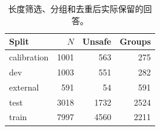 \begin{table}[t]
\centering\footnotesize
\caption{长度筛选、分组和去重后实际保留的回答。}\label{tab:dataset}
\begin{tabular}{lrrr}\toprule
Split & $N$ & Unsafe & Groups \\
\midrule
calibration & 1001 & 563 & 275 \\
dev & 1003 & 551 & 282 \\
external & 591 & 54 & 591 \\
test & 3018 & 1732 & 2524 \\
train & 7997 & 4560 & 2211 \\
\bottomrule\end{tabular}
\end{table}
